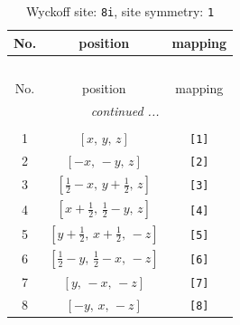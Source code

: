 \documentclass[fleqn,8pt]{jsarticle}
\begin{document}
\renewcommand{\arraystretch}{1.2}
\begin{longtable}{ccc}
\caption{Wyckoff site: {\tt 8i}, site symmetry: {\tt 1}}
 \\
 \hline \hline
No. & position & mapping \\ \hline \endfirsthead

\multicolumn{2}{l}{\tablename\ \thetable{}} \\
 \hline \hline
No. & position & mapping \\ \hline \endhead

 \hline \hline
\multicolumn{2}{r}{\footnotesize\it continued ...} \\ \endfoot

 \hline \hline
\multicolumn{2}{r}{} \\ \endlastfoot

1 & $\left[ x,\, y,\, z \right]$ & {\tt [1]} \\ \hline
2 & $\left[ - x,\, - y,\, z \right]$ & {\tt [2]} \\ \hline
3 & $\left[ \frac{1}{2} - x,\, y + \frac{1}{2},\, z \right]$ & {\tt [3]} \\ \hline
4 & $\left[ x + \frac{1}{2},\, \frac{1}{2} - y,\, z \right]$ & {\tt [4]} \\ \hline
5 & $\left[ y + \frac{1}{2},\, x + \frac{1}{2},\, - z \right]$ & {\tt [5]} \\ \hline
6 & $\left[ \frac{1}{2} - y,\, \frac{1}{2} - x,\, - z \right]$ & {\tt [6]} \\ \hline
7 & $\left[ y,\, - x,\, - z \right]$ & {\tt [7]} \\ \hline
8 & $\left[ - y,\, x,\, - z \right]$ & {\tt [8]} \\
\end{longtable}
\end{document}
